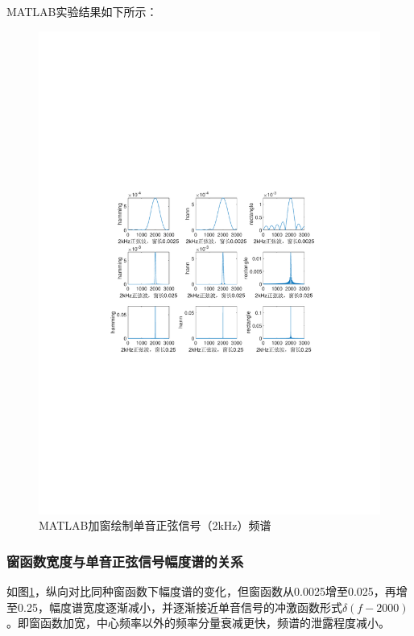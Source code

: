 \documentclass[12pt]{article}
\begin{document}
MATLAB实验结果如下所示：
\begin{figure}[H]
    \centering
    \includegraphics[scale=1]{matlab_sine.pdf}
    \caption{MATLAB加窗绘制单音正弦信号（2kHz）频谱}
    \label{MATLAB_sin}
\end{figure}

\subsubsection{窗函数宽度与单音正弦信号幅度谱的关系}
如图\ref{MATLAB_sin}，纵向对比同种窗函数下幅度谱的变化，但窗函数从0.0025增至0.025，再增至0.25，幅度谱宽度逐渐减小，并逐渐接近单音信号的冲激函数形式$\delta(f-2000)$。即窗函数加宽，中心频率以外的频率分量衰减更快，频谱的泄露程度减小。
\end{document}
